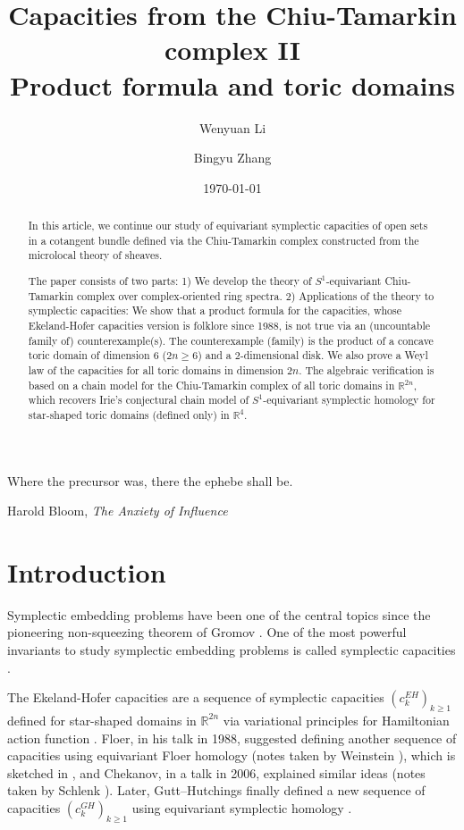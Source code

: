 \documentclass[11pt]{amsart}
\title[Capacities from the Chiu-Tamarkin complex II]{Capacities from the Chiu-Tamarkin complex II\\ Product formula and toric domains}
\author{Wenyuan Li}
\author{Bingyu Zhang}
\date{\today}
\numberwithin{equation}{section}
\theoremstyle{plain}
\theoremstyle{definition}
\theoremstyle{remark}
\newcommand{\bR} { {\mathbb{R}}}
\begin{document}
\begin{abstract}
In this article, we continue our study of equivariant symplectic capacities of open sets in a cotangent bundle defined via the Chiu-Tamarkin complex constructed from the microlocal theory of sheaves. 

The paper consists of two parts: 1) We develop the theory of $S^1$-equivariant Chiu-Tamarkin complex over complex-oriented ring spectra. 2) Applications of the theory to symplectic capacities: We show that a product formula for the capacities, whose Ekeland-Hofer capacities version is folklore since 1988, is not true via an (uncountable family of) counterexample(s). The counterexample (family) is the product of a concave toric domain of dimension $6$ ($2n\geq 6$) and a $2$-dimensional disk. We also prove a Weyl law of the capacities for all toric domains in dimension $2n$. The algebraic verification is based on a chain model for the Chiu-Tamarkin complex of all toric domains in $\bR^{2n}$, which recovers Irie's conjectural chain model of $S^1$-equivariant symplectic homology for star-shaped toric domains (defined only) in $\bR^4$.




\end{abstract}
\maketitle

\vspace{1cm}

\epigraph{Where the precursor was, there the ephebe shall be.}{Harold Bloom, \emph{The Anxiety of Influence}}

\vspace{1.5cm}

\tableofcontents

\newpage
\section{Introduction}


Symplectic embedding problems have been one of the central topics since the pioneering non-squeezing theorem of Gromov \cite{gromov1985}. One of the most powerful invariants to study symplectic embedding problems is called symplectic capacities \cite{EkelandHoferII,viterbo1992symplectic,quantitivesymplectic2010,hutchings2011,McDuffSchlenk2012,gutthutchings2018capacities,SiegelHigherCapacities}.

The Ekeland-Hofer capacities are a sequence of symplectic capacities $(c_k^{EH})_{k\geq 1}$ defined for star-shaped domains in $\bR^{2n}$ via variational principles for Hamiltonian action function \cite{EkelandHoferII}. Floer, in his talk in 1988, suggested defining another sequence of capacities using equivariant Floer homology \cite[Section 11.2]{Floer_book} (notes taken by Weinstein \cite{Floer_notes}), which is sketched in \cite{viterbo-functorsI}, and Chekanov, in a talk in 2006, explained similar ideas (notes taken by Schlenk \cite{Chekanov_notes}). Later, Gutt--Hutchings finally defined a new sequence of capacities $(c_k^{GH})_{k\geq 1}$ using equivariant symplectic homology \cite{gutthutchings2018capacities}.
\end{document}
